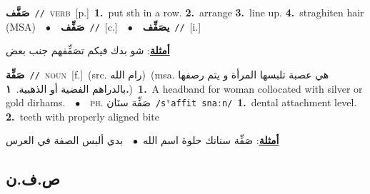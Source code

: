 \documentclass[10pt,a4paper,twoside]{article} %
\begin{document}
\begin{multicols}{2}
{\setlength\topsep{0pt}\textbf{\foreignlanguage{arabic}{صَفَّف}}\ {\color{gray}\texttt{//}\color{black}}\ \textsc{verb}\ [p.]\ \textbf{1.}~put sth in a row.  \textbf{2.}~arrange  \textbf{3.}~line up.  \textbf{4.}~straghiten hair (MSA)\ \ $\bullet$\ \ \setlength\topsep{0pt}\textbf{\foreignlanguage{arabic}{صَفِّف}}\ {\color{gray}\texttt{//}\color{black}}\ [c.]\ \ $\bullet$\ \ \setlength\topsep{0pt}\textbf{\foreignlanguage{arabic}{يصَفِّف}}\ {\color{gray}\texttt{//}\color{black}}\ [i.]\  \begin{flushright}\color{gray}\foreignlanguage{arabic}{\textbf{\underline{\foreignlanguage{arabic}{أمثلة}}}: شو بدك فيكم تصَفِّفهم جنب بعض}\end{flushright}\color{black}} \vspace{2mm}

{\setlength\topsep{0pt}\textbf{\foreignlanguage{arabic}{صَفِّة}}\ {\color{gray}\texttt{//}\color{black}}\ \textsc{noun}\ [f.]\ (src. \color{gray}\foreignlanguage{arabic}{رام الله}\color{black})\ \color{gray}(msa. \foreignlanguage{arabic}{هي عصبة تلبسها المرأة و يتم رصفها بالدراهم الفضية أو الذهبية.}~\foreignlanguage{arabic}{\textbf{١.}})\color{black}\ \textbf{1.}~A headband for woman collocated with silver or gold dirhams.\ \ $\bullet$\ \ \textsc{ph.} \color{gray} \foreignlanguage{arabic}{صَفِّة سنَان}\color{black}\ {\color{gray}\texttt{/{\sffamily sˤaffit snaːn}/}\color{black}}\ \textbf{1.}~dental attachment level.  \textbf{2.}~teeth  with properly aligned bite\  \begin{flushright}\color{gray}\foreignlanguage{arabic}{\textbf{\underline{\foreignlanguage{arabic}{أمثلة}}}: صَفِّة سنانك حلوة اسم الله\ $\bullet$\ \  بدي ألبس الصفة في العرس}\end{flushright}\color{black}} \vspace{2mm}

\vspace{-3mm}
\subsection*{\color{blue}\foreignlanguage{arabic}{ص.ف.ن}\color{blue}{}} 


\end{multicols}
\end{document}
